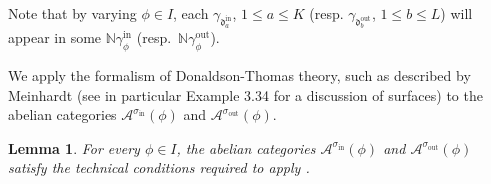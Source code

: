 \documentclass[12pt, a4paper]{amsart}
\newtheorem{lem}[defn]{Lemma}
\newcommand\NN{\mathbb N}
\newcommand\cA{\mathcal A}
\newcommand\fd{\mathfrak d}
\newcommand\iin{\mathrm{in}}
\newcommand\oout{\mathrm{out}}
\begin{document}
Note that by varying $\phi \in I$, each $\gamma_{\fd_a^\iin}$, $1 \leq a \leq K$
(resp. $\gamma_{\fd_b^\oout}$, $1 \leq b \leq L$) will appear in some $\NN \gamma_\phi^\iin$ (resp.\ $\NN \gamma_\phi^\oout$).




We apply the formalism of 
Donaldson-Thomas theory,
such as described by Meinhardt \cite{meinhardt2015donaldson} (see in particular Example 3.34 for a discussion of surfaces)
to the abelian categories $\cA^{\sigma_{\iin}}(\phi)$
and $\cA^{\sigma_{\oout}}(\phi)$.

\begin{lem} \label{lem_technical_meinh}
For every $\phi \in I$, the abelian categories $\cA^{\sigma_{\iin}}(\phi)$ and 
$\cA^{\sigma_{\oout}}(\phi)$ satisfy the technical conditions
required to apply
\cite[Theorem 1.1]{meinhardt2015donaldson}.
\end{lem}
\end{document}
